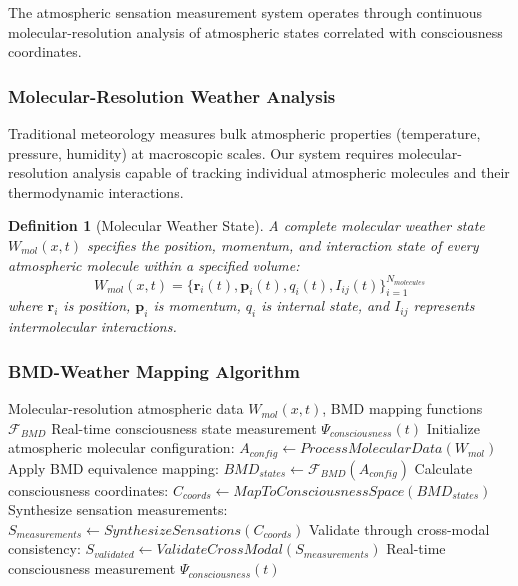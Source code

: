 \documentclass[12pt,a4paper]{article}
\newtheorem{definition}{Definition}
\begin{document}
The atmospheric sensation measurement system operates through continuous molecular-resolution analysis of atmospheric states correlated with consciousness coordinates.

\subsubsection{Molecular-Resolution Weather Analysis}

Traditional meteorology measures bulk atmospheric properties (temperature, pressure, humidity) at macroscopic scales. Our system requires molecular-resolution analysis capable of tracking individual atmospheric molecules and their thermodynamic interactions.

\begin{definition}[Molecular Weather State]
A complete molecular weather state $W_{mol}(x,t)$ specifies the position, momentum, and interaction state of every atmospheric molecule within a specified volume:
\begin{equation}
W_{mol}(x,t) = \{\mathbf{r}_i(t), \mathbf{p}_i(t), q_i(t), I_{ij}(t)\}_{i=1}^{N_{molecules}}
\end{equation}
where $\mathbf{r}_i$ is position, $\mathbf{p}_i$ is momentum, $q_i$ is internal state, and $I_{ij}$ represents intermolecular interactions.
\end{definition}

\subsubsection{BMD-Weather Mapping Algorithm}

\begin{algorithm}[H]
\caption{Real-Time Atmospheric Consciousness Measurement}
\begin{algorithmic}[1]
\REQUIRE Molecular-resolution atmospheric data $W_{mol}(x,t)$, BMD mapping functions $\mathcal{F}_{BMD}$
\ENSURE Real-time consciousness state measurement $\Psi_{consciousness}(t)$
\STATE Initialize atmospheric molecular configuration: $A_{config} \leftarrow ProcessMolecularData(W_{mol})$
\STATE Apply BMD equivalence mapping: $BMD_{states} \leftarrow \mathcal{F}_{BMD}(A_{config})$
\STATE Calculate consciousness coordinates: $C_{coords} \leftarrow MapToConsciousnessSpace(BMD_{states})$
\STATE Synthesize sensation measurements: $S_{measurements} \leftarrow SynthesizeSensations(C_{coords})$
\STATE Validate through cross-modal consistency: $S_{validated} \leftarrow ValidateCrossModal(S_{measurements})$
\RETURN Real-time consciousness measurement $\Psi_{consciousness}(t)$
\end{algorithmic}
\end{algorithm}
\end{document}
